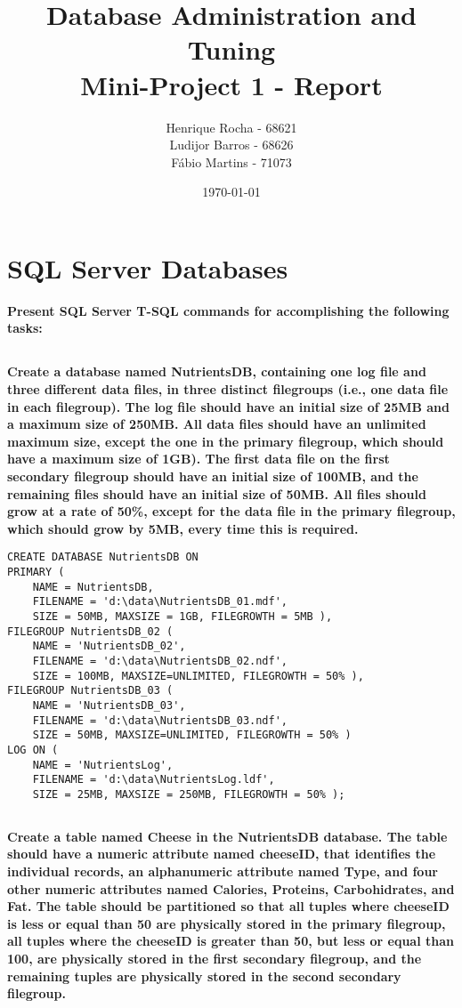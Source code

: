 \documentclass[11pt,report]{article}
\title{	Database Administration and Tuning \\ Mini-Project 1 - Report}
\author{
	Henrique Rocha - 68621 \\
	Ludijor Barros - 68626 \\
	Fábio Martins - 71073
}
\date{\today}
\begin{document}
	\maketitle
\section{SQL Server Databases}
	\textbf{Present SQL Server T-SQL commands for accomplishing the following tasks:}
	\subsection{}
	\textbf{Create a database named NutrientsDB, containing one log file and three different data files, in three distinct filegroups (i.e., one data file in each filegroup). The log file should have an initial size of 25MB and a maximum size of 250MB. All data files should have an unlimited maximum size, except the one in the primary filegroup, which should have a maximum size of 1GB). The first data file on the first secondary filegroup should have an initial size of 100MB, and the remaining files should have an initial size of 50MB. All files should grow at a rate of 50\%, except for the data file in the primary filegroup, which should grow by 5MB, every time this is required.}

\begin{lstlisting}
CREATE DATABASE NutrientsDB ON 
PRIMARY (
	NAME = NutrientsDB,
	FILENAME = 'd:\data\NutrientsDB_01.mdf',
	SIZE = 50MB, MAXSIZE = 1GB, FILEGROWTH = 5MB ),
FILEGROUP NutrientsDB_02 (
	NAME = 'NutrientsDB_02', 
	FILENAME = 'd:\data\NutrientsDB_02.ndf', 
	SIZE = 100MB, MAXSIZE=UNLIMITED, FILEGROWTH = 50% ),
FILEGROUP NutrientsDB_03 (
	NAME = 'NutrientsDB_03', 
	FILENAME = 'd:\data\NutrientsDB_03.ndf', 
	SIZE = 50MB, MAXSIZE=UNLIMITED, FILEGROWTH = 50% )
LOG ON (
	NAME = 'NutrientsLog',
	FILENAME = 'd:\data\NutrientsLog.ldf',
	SIZE = 25MB, MAXSIZE = 250MB, FILEGROWTH = 50% );
\end{lstlisting}

	\subsection{}
	\textbf{Create a table named Cheese in the NutrientsDB database. The table should have a numeric attribute named cheeseID, that identifies the individual records, an alphanumeric attribute named Type, and four other numeric attributes named Calories, Proteins, Carbohidrates, and Fat. The table should be partitioned so that all tuples where cheeseID is less or equal than 50 are physically stored in the primary filegroup, all tuples where the cheeseID is greater than 50, but less or equal than 100, are physically stored in the first secondary filegroup, and the remaining tuples are physically stored in the second secondary filegroup.}
\end{document}
